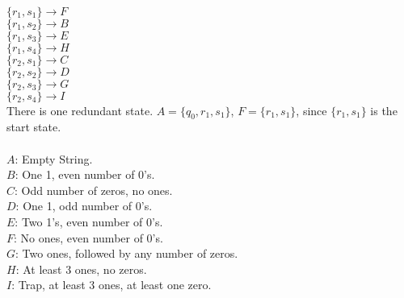 \begin{problem}{5}
   \\
  $\{r_1,s_1\} \rightarrow F$ \\
  $\{r_1,s_2\} \rightarrow B$ \\
  $\{r_1,s_3\} \rightarrow E$ \\
  $\{r_1,s_4\} \rightarrow H$ \\
  $\{r_2,s_1\} \rightarrow C$ \\
  $\{r_2,s_2\} \rightarrow D$ \\
  $\{r_2,s_3\} \rightarrow G$ \\
  $\{r_2,s_4\} \rightarrow I$ \\

  \noindent There is one redundant state. $A = \{ q_0, r_1, s_1 \}$, $F = \{ r_1, s_1 \}$, since $\{ r_1, s_1 \}$ is the start
  state. \\

   \\
  $A$: Empty String. \\
  $B$: One 1, even number of 0's. \\
  $C$: Odd number of zeros, no ones. \\
  $D$: One 1, odd number of 0's. \\
  $E$: Two 1's, even number of 0's. \\
  $F$: No ones, even number of 0's. \\
  $G$: Two ones, followed by any number of zeros. \\
  $H$: At least 3 ones, no zeros. \\
  $I$: Trap, at least 3 ones, at least one zero. \\

\end{problem}

